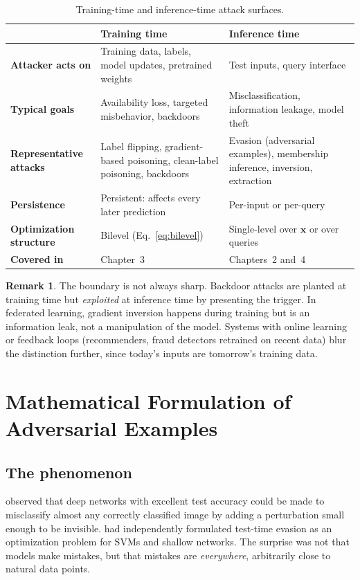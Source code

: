 \documentclass[10pt,a4paper]{extarticle}
\theoremstyle{definition}
\newtheorem{remark}{Remark}[section]
\newcommand{\x}{\mathbf{x}}
\begin{document}
\begin{table}[h]
\centering
\small
\begin{tabularx}{\textwidth}{>{\bfseries}l X X}
\toprule
 & Training time & Inference time \\
\midrule
Attacker acts on & Training data, labels, model updates, pretrained weights & Test inputs, query interface \\
Typical goals & Availability loss, targeted misbehavior, backdoors & Misclassification, information leakage, model theft \\
Representative attacks & Label flipping, gradient-based poisoning, clean-label poisoning, backdoors & Evasion (adversarial examples), membership inference, inversion, extraction \\
Persistence & Persistent: affects every later prediction & Per-input or per-query \\
Optimization structure & Bilevel (Eq.~\ref{eq:bilevel}) & Single-level over \(\x\) or over queries \\
Covered in & Chapter~3 & Chapters~2 and~4 \\
\bottomrule
\end{tabularx}
\caption{Training-time and inference-time attack surfaces.}
\label{tab:surfaces}
\end{table}

\begin{remark}
The boundary is not always sharp. Backdoor attacks are planted at training time but \emph{exploited} at inference time by presenting the trigger. In federated learning, gradient inversion happens during training but is an information leak, not a manipulation of the model. Systems with online learning or feedback loops (recommenders, fraud detectors retrained on recent data) blur the distinction further, since today's inputs are tomorrow's training data.
\end{remark}

\section{Mathematical Formulation of Adversarial Examples}\label{sec:formulation}

\subsection{The phenomenon}

\citet{szegedy2014intriguing} observed that deep networks with excellent test accuracy could be made to misclassify almost any correctly classified image by adding a perturbation small enough to be invisible. \citet{biggio2013evasion} had independently formulated test-time evasion as an optimization problem for SVMs and shallow networks. The surprise was not that models make mistakes, but that mistakes are \emph{everywhere}, arbitrarily close to natural data points.
\end{document}
